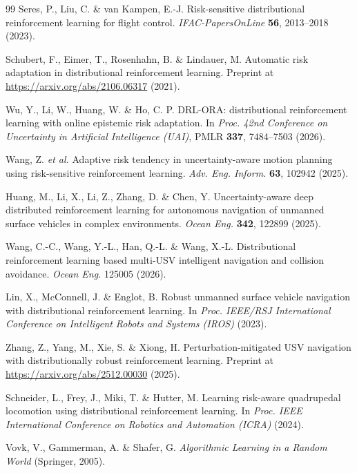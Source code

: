 \begin{thebibliography}{99}
 Seres, P., Liu, C. \& van Kampen, E.-J. Risk-sensitive distributional reinforcement learning for flight control. \textit{IFAC-PapersOnLine} \textbf{56}, 2013--2018 (2023).

 Schubert, F., Eimer, T., Rosenhahn, B. \& Lindauer, M. Automatic risk adaptation in distributional reinforcement learning. Preprint at \url{https://arxiv.org/abs/2106.06317} (2021).

 Wu, Y., Li, W., Huang, W. \& Ho, C. P. DRL-ORA: distributional reinforcement learning with online epistemic risk adaptation. In \textit{Proc. 42nd Conference on Uncertainty in Artificial Intelligence (UAI)}, PMLR \textbf{337}, 7484--7503 (2026).

 Wang, Z. \textit{et al.} Adaptive risk tendency in uncertainty-aware motion planning using risk-sensitive reinforcement learning. \textit{Adv. Eng. Inform.} \textbf{63}, 102942 (2025).

 Huang, M., Li, X., Li, Z., Zhang, D. \& Chen, Y. Uncertainty-aware deep distributed reinforcement learning for autonomous navigation of unmanned surface vehicles in complex environments. \textit{Ocean Eng.} \textbf{342}, 122899 (2025).

 Wang, C.-C., Wang, Y.-L., Han, Q.-L. \& Wang, X.-L. Distributional reinforcement learning based multi-USV intelligent navigation and collision avoidance. \textit{Ocean Eng.} 125005 (2026).

 Lin, X., McConnell, J. \& Englot, B. Robust unmanned surface vehicle navigation with distributional reinforcement learning. In \textit{Proc. IEEE/RSJ International Conference on Intelligent Robots and Systems (IROS)} (2023).

 Zhang, Z., Yang, M., Xie, S. \& Xiong, H. Perturbation-mitigated USV navigation with distributionally robust reinforcement learning. Preprint at \url{https://arxiv.org/abs/2512.00030} (2025).

 Schneider, L., Frey, J., Miki, T. \& Hutter, M. Learning risk-aware quadrupedal locomotion using distributional reinforcement learning. In \textit{Proc. IEEE International Conference on Robotics and Automation (ICRA)} (2024).

 Vovk, V., Gammerman, A. \& Shafer, G. \textit{Algorithmic Learning in a Random World} (Springer, 2005).


\end{thebibliography}
